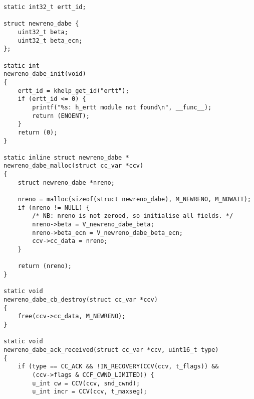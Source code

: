 \begin{code}
\begin{verbatim}
static int32_t ertt_id;

struct newreno_dabe {
    uint32_t beta;
    uint32_t beta_ecn;
};

static int
newreno_dabe_init(void)
{
    ertt_id = khelp_get_id("ertt");
    if (ertt_id <= 0) {
        printf("%s: h_ertt module not found\n", __func__);
        return (ENOENT);
    }
    return (0);
}

static inline struct newreno_dabe *
newreno_dabe_malloc(struct cc_var *ccv)
{
    struct newreno_dabe *nreno;

    nreno = malloc(sizeof(struct newreno_dabe), M_NEWRENO, M_NOWAIT);
    if (nreno != NULL) {
        /* NB: nreno is not zeroed, so initialise all fields. */
        nreno->beta = V_newreno_dabe_beta;
        nreno->beta_ecn = V_newreno_dabe_beta_ecn;
        ccv->cc_data = nreno;
    }

    return (nreno);
}

static void
newreno_dabe_cb_destroy(struct cc_var *ccv)
{
    free(ccv->cc_data, M_NEWRENO);
}

static void
newreno_dabe_ack_received(struct cc_var *ccv, uint16_t type)
{
    if (type == CC_ACK && !IN_RECOVERY(CCV(ccv, t_flags)) &&
        (ccv->flags & CCF_CWND_LIMITED)) {
        u_int cw = CCV(ccv, snd_cwnd);
        u_int incr = CCV(ccv, t_maxseg);


\end{verbatim}
\end{code}
